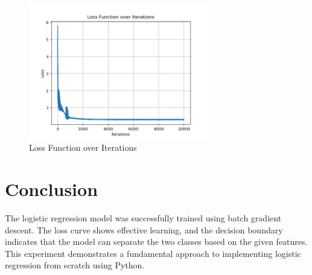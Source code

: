 \documentclass[a4paper, 12pt]{article}
\begin{document}
\begin{figure}[H]
    \centering
    \includegraphics[width=0.7\textwidth]{Figure_2.png}
    \caption{Loss Function over Iterations}
\end{figure}

\section{Conclusion}
The logistic regression model was successfully trained using batch gradient descent. The loss curve shows effective learning, and the decision boundary indicates that the model can separate the two classes based on the given features. This experiment demonstrates a fundamental approach to implementing logistic regression from scratch using Python.
\end{document}
